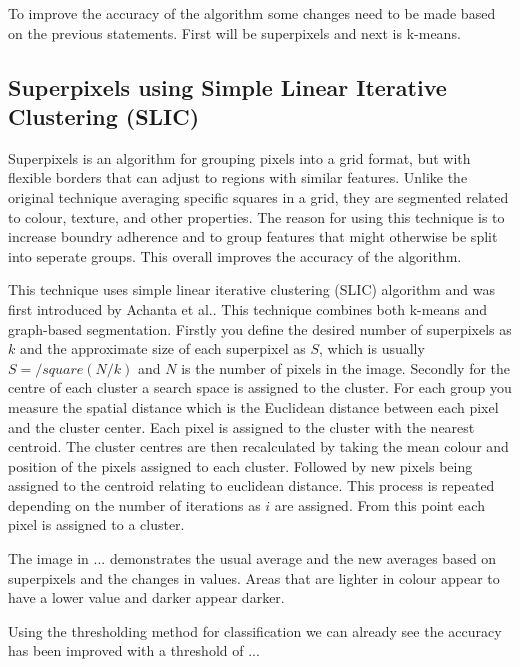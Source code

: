 To improve the accuracy of the algorithm some changes need to be made based on the previous statements. First will be superpixels and next is k-means.

\subsection{Superpixels using Simple Linear Iterative Clustering (SLIC)}
Superpixels is an algorithm for grouping pixels into a grid format, but with flexible borders that can adjust to regions with similar features. Unlike the original technique averaging specific squares in a grid\cite{Kasmi2016}, they are segmented related to colour, texture, and other properties. The reason for using this technique is to increase boundry adherence and to group features that might otherwise be split into seperate groups. This overall improves the accuracy of the algorithm.

This technique uses simple linear iterative clustering (SLIC) algorithm and was first introduced by Achanta et al.\cite{Achanta2012}. This technique combines both k-means and graph-based segmentation. Firstly you define the desired number of superpixels as $k$ and the approximate size of each superpixel as $S$, which is usually $S = /square(N/k)$ and $N$ is the number of pixels in the image. Secondly for the centre of each cluster a search space is assigned to the cluster. For each group you measure the spatial distance which is the Euclidean distance between each pixel and the cluster center. Each pixel is assigned to the cluster with the nearest centroid. The cluster centres are then recalculated by taking the mean colour and position of the pixels assigned to each cluster. Followed by new pixels being assigned to the centroid relating to euclidean distance. This process is repeated depending on the number of iterations as $i$ are assigned. From this point each pixel is assigned to a cluster.

The image in ... demonstrates the usual average and the new averages based on superpixels and the changes in values. Areas that are lighter in colour appear to have a lower value and darker appear darker.

Using the thresholding method for classification we can already see the accuracy has been improved with a threshold of ...

